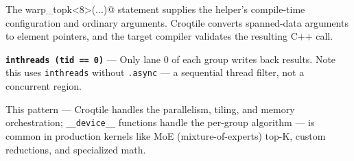 The \co@call warp_topk<8>(...)@ statement supplies the helper's compile-time configuration and ordinary arguments. Croqtile converts spanned-data arguments to element pointers, and the target compiler validates the resulting C++ call.

\textbf{\texttt{inthreads (tid == 0)}} --- Only lane 0 of each group writes back results. Note this uses \texttt{inthreads} without \texttt{.async} --- a sequential thread filter, not a concurrent region.

This pattern --- Croqtile handles the parallelism, tiling, and memory orchestration; \texttt{\_\_device\_\_} functions handle the per-group algorithm --- is common in production kernels like MoE (mixture-of-experts) top-K, custom reductions, and specialized math.
